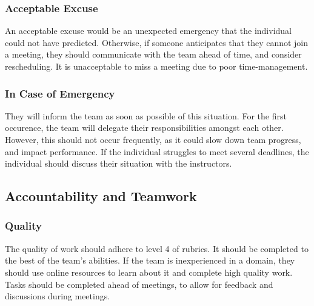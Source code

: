 \documentclass{article}
\begin{document}
\subsubsection*{Acceptable Excuse}

\begin{comment}
\wss{What constitutes an acceptable excuse for missing a meeting or a deadline?
What types of excuses will not be considered acceptable?}
\end{comment}
An acceptable excuse would be an unexpected emergency that the individual could not have predicted. Otherwise, if someone anticipates that they cannot join a meeting, they should communicate with the team ahead of time, and consider rescheduling. It is unacceptable to miss a meeting due to poor time-management.

\subsubsection*{In Case of Emergency}

\begin{comment}
\wss{What process will team members follow if they have an emergency and cannot
attend a team meeting or complete their individual work promised for a team
deliverable?}
\end{comment}
They will inform the team as soon as possible of this situation. For the first occurence, the team will delegate their responsibilities amongst each other. However, this should not occur frequently, as it could slow down team progress, and impact performance. If the individual struggles to meet several deadlines, the individual should discuss their situation with the instructors.

\subsection*{Accountability and Teamwork}

\subsubsection*{Quality} 

\begin{comment}
\wss{What are your team's expectations regarding the quality
of team members' preparation for team meetings and the quality of the
deliverables that members bring to the team?}
\end{comment}

The quality of work should adhere to level 4 of rubrics. It should be completed to the best of the team's abilities. If the team is inexperienced in a domain, they should use online resources to learn about it and complete high quality work. Tasks should be completed ahead of meetings, to allow for feedback and discussions during meetings.
\end{document}
